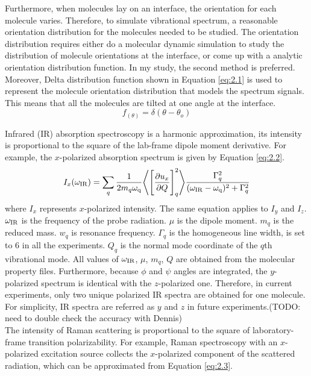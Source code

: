 Furthermore, when molecules lay on an interface, the orientation for each molecule varies. Therefore, to simulate vibrational spectrum, a reasonable orientation distribution for the molecules needed to be studied. The orientation distribution requires either do a molecular dynamic simulation to study the distribution of molecule orientations at the interface, or come up with a analytic orientation distribution function. In my study, the second method is preferred. Moreover, Delta distribution function shown in Equation \ref{eq:2.1} is used to represent the molecule orientation distribution that models the spectrum signals. This means that all the molecules are tilted at one angle at the interface.\\
\begin{equation} \label{eq:2.1}
f_{(\theta)} = \delta(\theta - \theta_{o})
\end{equation} 

Infrared (IR) absorption spectroscopy is a harmonic approximation, its intensity is proportional to the square of the lab-frame dipole moment derivative. For example, the $x$-polarized absorption spectrum is given by Equation \ref{eq:2.2}. \\

\begin{equation} \label{eq:2.2}
I_x(\omega_{\rm IR}) = \sum_{q} \frac{1}{2 m_{q} \omega_{\rm q}} \Bigg \langle \Bigg\lbrack \frac{\partial u_x}{\partial Q} \Bigg\rbrack_{q} ^2 \Bigg\rangle \frac{\Gamma_q^2}{(\omega_{\rm IR}-\omega_{\rm q})^2 + \Gamma_q^2}
\end{equation} 
where $I_x$ represents $x$-polarized intensity. The same equation applies to $I_y$ and $I_z$. $\omega_{\rm IR}$ is the frequency of the probe radiation. $\mu$ is the dipole moment. $m_q$ is the reduced mass. $w_q$ is resonance frequency. $\Gamma_q$ is the homogeneous line width, is set to 6 in all the experiments. $Q_q$ is the normal mode coordinate of the $q$th vibrational mode. All values of $\omega_{\rm IR}$, $\mu$, $m_q$, $Q$ are obtained from the molecular property files. Furthermore, because $\phi$ and $\psi$ angles are integrated, the $y$-polarized spectrum is identical with the $z$-polarized one. Therefore, in current experiments, only two unique polarized IR spectra are obtained for one molecule. For simplicity, IR spectra are referred as $y$ and $z$ in future experiments.(TODO: need to double check the accuracy with Dennis)\\


The intensity of Raman scattering is proportional to the square of laboratory-frame transition polarizability. For example, Raman spectroscopy with an $x$-polarized excitation source collects the $x$-polarized component of the scattered radiation, which can be approximated from Equation \ref{eq:2.3}. \\

